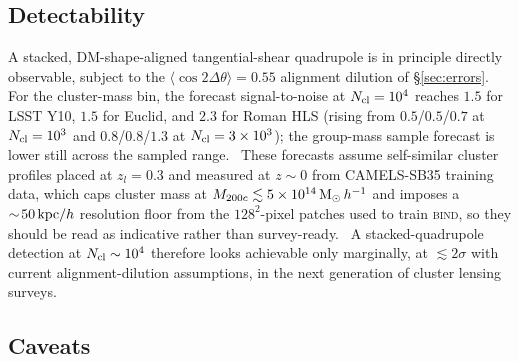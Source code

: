 \documentclass[11pt]{article}
\newcommand{\bind}{\textsc{bind}}
\newcommand{\Msun}{{\rm M}_\odot}
\newcommand{\Mhalo}{M_{200c}}
\begin{document}
\subsection{Detectability}

A stacked, DM-shape-aligned tangential-shear quadrupole is in principle
directly observable, subject to the $\langle\cos2\Delta\theta\rangle=0.55$
alignment dilution of \S\ref{sec:errors}. For the cluster-mass bin, the
forecast signal-to-noise at $N_{\rm cl}=10^4$ reaches $1.5$ for LSST Y10,
$1.5$ for Euclid, and $2.3$ for Roman HLS (rising from $0.5$/$0.5$/$0.7$
at $N_{\rm cl}=10^3$ and $0.8$/$0.8$/$1.3$ at $N_{\rm
cl}=3\times10^3$); the group-mass sample forecast is lower still across
the sampled range.\ %
These forecasts assume self-similar cluster profiles placed at
$z_l=0.3$ and measured at $z\sim0$ from CAMELS-SB35 training data, which
caps cluster mass at $\Mhalo\lesssim5\times10^{14}\,\Msun\,h^{-1}$ and
imposes a $\sim\!50\,{\rm kpc}/h$ resolution floor from the $128^2$-pixel
patches used to train \bind{}, so they should be read as indicative
rather than survey-ready.\ %
A stacked-quadrupole detection at $N_{\rm cl}\sim10^4$ therefore looks
achievable only marginally, at $\lesssim\!2\sigma$ with current
alignment-dilution assumptions, in the next generation of cluster
lensing surveys.

\subsection{Caveats}\label{sec:caveats}
\end{document}
